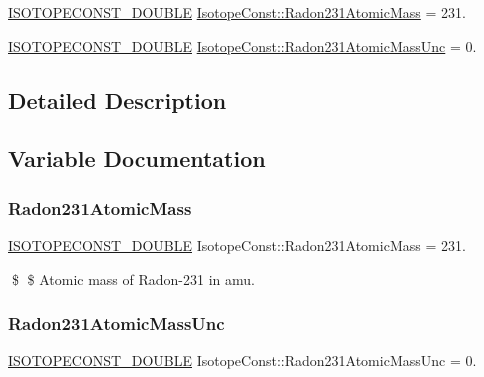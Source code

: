 \begin{DoxyCompactItemize}
\item 
\mbox{\hyperlink{group___isotope_const-_macros_ga8f45a7272ce02c0b4c65c44636ed719a}{I\+S\+O\+T\+O\+P\+E\+C\+O\+N\+S\+T\+\_\+\+D\+O\+U\+B\+LE}} \mbox{\hyperlink{group___isotope_const-_radon-_rn231_ga0409f17f8fc5e077b6f38439128f1618}{Isotope\+Const\+::\+Radon231\+Atomic\+Mass}} = 231.
\item 
\mbox{\hyperlink{group___isotope_const-_macros_ga8f45a7272ce02c0b4c65c44636ed719a}{I\+S\+O\+T\+O\+P\+E\+C\+O\+N\+S\+T\+\_\+\+D\+O\+U\+B\+LE}} \mbox{\hyperlink{group___isotope_const-_radon-_rn231_ga8d5c2f7fcb3ecc8c045a09c2af0711c1}{Isotope\+Const\+::\+Radon231\+Atomic\+Mass\+Unc}} = 0.
\end{DoxyCompactItemize}


\subsection{Detailed Description}


\subsection{Variable Documentation}
\mbox{\label{group___isotope_const-_radon-_rn231_ga0409f17f8fc5e077b6f38439128f1618}} 
\subsubsection{\texorpdfstring{Radon231\+Atomic\+Mass}{Radon231AtomicMass}}
{\footnotesize\ttfamily \mbox{\hyperlink{group___isotope_const-_macros_ga8f45a7272ce02c0b4c65c44636ed719a}{I\+S\+O\+T\+O\+P\+E\+C\+O\+N\+S\+T\+\_\+\+D\+O\+U\+B\+LE}} Isotope\+Const\+::\+Radon231\+Atomic\+Mass = 231.}

\$ \$ Atomic mass of Radon-\/231 in amu. \mbox{\label{group___isotope_const-_radon-_rn231_ga8d5c2f7fcb3ecc8c045a09c2af0711c1}} 
\subsubsection{\texorpdfstring{Radon231\+Atomic\+Mass\+Unc}{Radon231AtomicMassUnc}}
{\footnotesize\ttfamily \mbox{\hyperlink{group___isotope_const-_macros_ga8f45a7272ce02c0b4c65c44636ed719a}{I\+S\+O\+T\+O\+P\+E\+C\+O\+N\+S\+T\+\_\+\+D\+O\+U\+B\+LE}} Isotope\+Const\+::\+Radon231\+Atomic\+Mass\+Unc = 0.}

